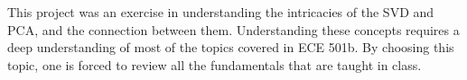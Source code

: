 \documentclass[conference]{IEEEtran}
\begin{document}
    This project was an exercise in understanding the intricacies of the SVD and PCA, and the connection between them. Understanding these concepts requires a deep understanding of most of the topics covered in ECE 501b. By choosing this topic, one is forced to review all the fundamentals that are taught in class.


    {}
    
\end{document}
